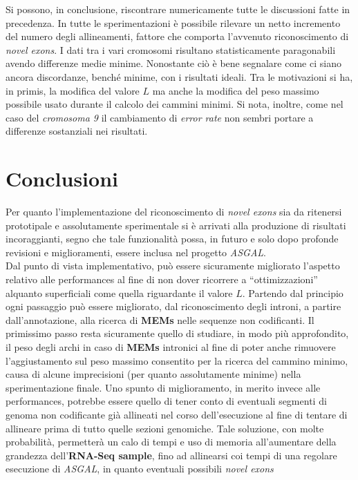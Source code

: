 \documentclass[a4paper,12pt, oneside]{book}
\begin{document}
\vspace{1cm}
Si possono, in conclusione, riscontrare numericamente tutte le discussioni fatte
in precedenza. In tutte le sperimentazioni è possibile rilevare un netto
incremento del numero degli allineamenti, fattore che comporta l'avvenuto
riconoscimento di \textit{novel exons}. I dati tra i vari cromosomi risultano
statisticamente paragonabili avendo differenze medie minime. Nonostante ciò è
bene segnalare come ci siano ancora discordanze, benché minime, con i risultati
ideali. Tra le motivazioni si ha, in primis, la modifica del valore $L$ ma anche
la modifica del peso massimo possibile usato durante il calcolo dei cammini
minimi. Si nota, inoltre, come nel caso del \textit{cromosoma 9} il cambiamento
di \textit{error rate} non sembri portare a differenze sostanziali nei
risultati.  
\chapter{Conclusioni}
Per quanto l'implementazione del riconoscimento di \textit{novel exons} sia da
ritenersi prototipale e assolutamente sperimentale si è arrivati alla
produzione di risultati incoraggianti, segno che tale funzionalità possa, in
futuro e solo dopo profonde revisioni e miglioramenti, essere inclusa nel
progetto \textit{ASGAL}.\\
Dal punto di vista implementativo, può essere
sicuramente migliorato l'aspetto relativo alle performances al fine di non dover
ricorrere a ``ottimizzazioni'' alquanto superficiali come quella riguardante il
valore $L$. Partendo dal principio ogni passaggio può essere migliorato, dal
riconoscimento degli introni, a partire dall'annotazione, alla ricerca di
\textbf{MEMs} nelle sequenze non codificanti. Il primissimo passo resta
sicuramente quello di studiare, in modo più approfondito, il peso degli archi in
caso di \textbf{MEMs} intronici al fine di poter anche rimuovere l'aggiustamento
sul peso massimo consentito per la ricerca del cammino minimo, causa di alcune
imprecisioni (per quanto assolutamente minime) nella sperimentazione finale.
Uno spunto di miglioramento, in merito invece alle performances, potrebbe essere
quello di tener conto di eventuali segmenti di genoma non codificante già
allineati nel corso dell'esecuzione al fine di tentare di allineare prima di
tutto quelle sezioni genomiche. Tale soluzione, con molte probabilità,
permetterà un 
calo di tempi e uso di memoria all'aumentare della grandezza
dell'\textbf{RNA-Seq sample}, fino ad allinearsi coi tempi di una regolare
esecuzione di \textit{ASGAL}, in quanto eventuali possibili \textit{novel exons}
\end{document}
